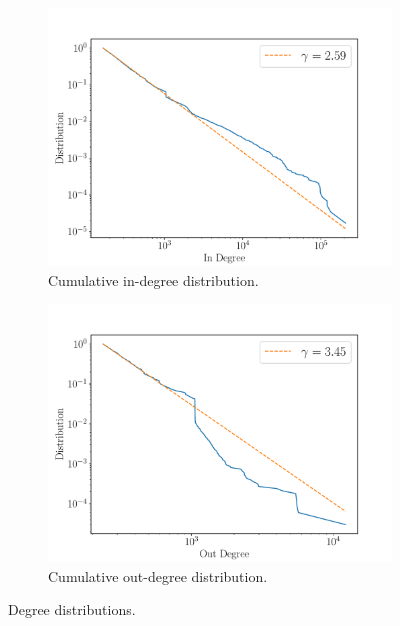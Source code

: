 \documentclass[9pt,a4paper,twocolumn]{article}
\begin{document}
\begin{figure}[h]
	\centering
	\begin{subfigure}{.475\textwidth}
		\centering
		\includegraphics[width=\linewidth]{wikipedia_pt_in.pdf}
		\caption{Cumulative in-degree distribution.}
		\label{fig:inddist}
	\end{subfigure}
	\begin{subfigure}{.475\textwidth}
		\centering
		\includegraphics[width=\linewidth]{wikipedia_pt_out.pdf}
		\caption{Cumulative out-degree distribution.}
		\label{fig:outddist}
	\end{subfigure}
	\caption{Degree distributions.}
\end{figure}
\end{document}
